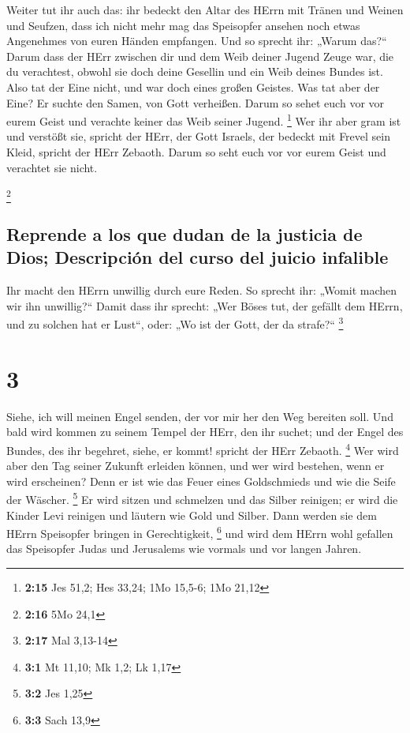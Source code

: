  Weiter tut ihr auch das: ihr bedeckt den Altar des HErrn
mit Tränen und Weinen und Seufzen, dass ich nicht mehr mag das
Speisopfer ansehen noch etwas Angenehmes von euren Händen empfangen.
 Und so sprecht ihr: „Warum das?{}`` Darum dass der HErr
zwischen dir und dem Weib deiner Jugend Zeuge war, die du verachtest,
obwohl sie doch deine Gesellin und ein Weib deines Bundes ist.
 Also tat der Eine nicht, und war doch eines großen
Geistes. Was tat aber der Eine? Er suchte den Samen, von Gott verheißen.
Darum so sehet euch vor vor eurem Geist und verachte keiner das Weib
seiner Jugend. \footnote{\textbf{2:15} Jes 51,2; Hes 33,24; 1Mo 15,5-6;
  1Mo 21,12}  Wer ihr aber gram ist und verstößt sie,
spricht der HErr, der Gott Israels, der bedeckt mit Frevel sein Kleid,
spricht der HErr Zebaoth. Darum so seht euch vor vor eurem Geist und
verachtet sie nicht.

\footnote{\textbf{2:16} 5Mo 24,1}

\hypertarget{reprende-a-los-que-dudan-de-la-justicia-de-dios-descripciuxf3n-del-curso-del-juicio-infalible}{%
\subsection{Reprende a los que dudan de la justicia de Dios; Descripción
del curso del juicio
infalible}\label{reprende-a-los-que-dudan-de-la-justicia-de-dios-descripciuxf3n-del-curso-del-juicio-infalible}}

 Ihr macht den HErrn unwillig durch eure Reden. So
sprecht ihr: „Womit machen wir ihn unwillig?{}`` Damit dass ihr sprecht:
„Wer Böses tut, der gefällt dem HErrn, und zu solchen hat er Lust``,
oder: „Wo ist der Gott, der da strafe?{}`` \footnote{\textbf{2:17} Mal
  3,13-14}

\hypertarget{section-2}{%
\section{3}\label{section-2}}

 Siehe, ich will meinen Engel senden, der vor mir her den
Weg bereiten soll. Und bald wird kommen zu seinem Tempel der HErr, den
ihr suchet; und der Engel des Bundes, des ihr begehret, siehe, er kommt!
spricht der HErr Zebaoth. \footnote{\textbf{3:1} Mt 11,10; Mk 1,2; Lk
  1,17}  Wer wird aber den Tag seiner Zukunft erleiden
können, und wer wird bestehen, wenn er wird erscheinen? Denn er ist wie
das Feuer eines Goldschmieds und wie die Seife der Wäscher. \footnote{\textbf{3:2}
  Jes 1,25}  Er wird sitzen und schmelzen und das Silber
reinigen; er wird die Kinder Levi reinigen und läutern wie Gold und
Silber. Dann werden sie dem HErrn Speisopfer bringen in Gerechtigkeit,
\footnote{\textbf{3:3} Sach 13,9}  und wird dem HErrn wohl
gefallen das Speisopfer Judas und Jerusalems wie vormals und vor langen
Jahren.

